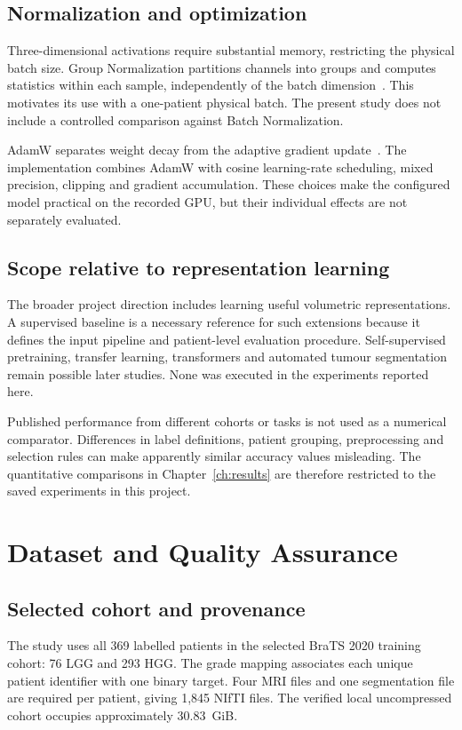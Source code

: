 \documentclass[12pt,a4paper,oneside]{report}
\begin{document}
\section{Normalization and optimization}
Three-dimensional activations require substantial memory, restricting the physical batch size. Group Normalization partitions channels into groups and computes statistics within each sample, independently of the batch dimension~\cite{groupnorm}. This motivates its use with a one-patient physical batch. The present study does not include a controlled comparison against Batch Normalization.

AdamW separates weight decay from the adaptive gradient update~\cite{adamw}. The implementation combines AdamW with cosine learning-rate scheduling, mixed precision, clipping and gradient accumulation. These choices make the configured model practical on the recorded GPU, but their individual effects are not separately evaluated.

\section{Scope relative to representation learning}
The broader project direction includes learning useful volumetric representations. A supervised baseline is a necessary reference for such extensions because it defines the input pipeline and patient-level evaluation procedure. Self-supervised pretraining, transfer learning, transformers and automated tumour segmentation remain possible later studies. None was executed in the experiments reported here.

Published performance from different cohorts or tasks is not used as a numerical comparator. Differences in label definitions, patient grouping, preprocessing and selection rules can make apparently similar accuracy values misleading. The quantitative comparisons in Chapter~\ref{ch:results} are therefore restricted to the saved experiments in this project.

\chapter{Dataset and Quality Assurance}
\label{ch:data}
\section{Selected cohort and provenance}
The study uses all 369 labelled patients in the selected BraTS 2020 training cohort: 76 LGG and 293 HGG. The grade mapping associates each unique patient identifier with one binary target. Four MRI files and one segmentation file are required per patient, giving 1,845 NIfTI files. The verified local uncompressed cohort occupies approximately 30.83~GiB.
\end{document}
